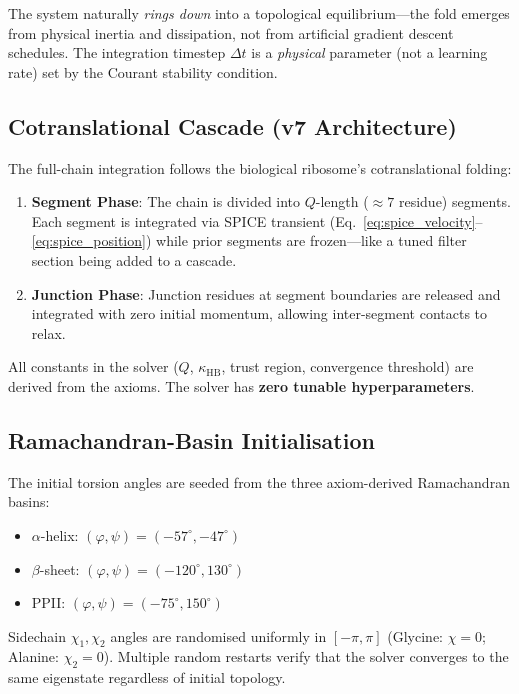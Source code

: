 The system naturally \emph{rings down} into a topological equilibrium---the fold emerges from physical inertia and dissipation, not from artificial gradient descent schedules.  The integration timestep $\Delta t$ is a \emph{physical} parameter (not a learning rate) set by the Courant stability condition.

\subsection{Cotranslational Cascade (v7 Architecture)}
\label{sec:cotranslational}

The full-chain integration follows the biological ribosome's cotranslational folding:
\begin{enumerate}
    \item \textbf{Segment Phase}: The chain is divided into $Q$-length ($\approx 7$ residue) segments.  Each segment is integrated via SPICE transient (Eq.~\ref{eq:spice_velocity}--\ref{eq:spice_position}) while prior segments are frozen---like a tuned filter section being added to a cascade.
    \item \textbf{Junction Phase}: Junction residues at segment boundaries are released and integrated with zero initial momentum, allowing inter-segment contacts to relax.
\end{enumerate}

All constants in the solver ($Q$, $\kappa_\text{HB}$, trust region, convergence threshold) are derived from the axioms.  The solver has \textbf{zero tunable hyperparameters}.

\subsection{Ramachandran-Basin Initialisation}

The initial torsion angles are seeded from the three axiom-derived Ramachandran basins:
\begin{itemize}
    \item $\alpha$-helix: $(\varphi, \psi) = (-57^\circ, -47^\circ)$
    \item $\beta$-sheet: $(\varphi, \psi) = (-120^\circ, 130^\circ)$
    \item PPII: $(\varphi, \psi) = (-75^\circ, 150^\circ)$
\end{itemize}
Sidechain $\chi_1, \chi_2$ angles are randomised uniformly in $[-\pi, \pi]$ (Glycine: $\chi = 0$; Alanine: $\chi_2 = 0$).  Multiple random restarts verify that the solver converges to the same eigenstate regardless of initial topology.

